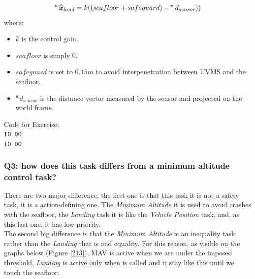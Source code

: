 \documentclass{article}
\begin{document}
\begin{equation}
\large
    ^{w}\dot{\overline{\boldsymbol{x}}}_{land} = k((seafloor + safeguard) - ^w d_{sensor})) %
\end{equation}
where:
\begin{itemize}
    \item $k$ is the control gain.
    \item $seafloor$ is simply 0.
    \item $safeguard$ is set to $0.15m$  to avoid interpenetration between UVMS and the seafloor.
    \item $^w d_{sensor}$ is the distance vector measured by the sensor and projected on the world frame.
\end{itemize} 

\colorbox{mygray}{\parbox{0.9\textwidth}{Code for Exercise: \\
\texttt{TO DO}\\
\texttt{TO DO}
}}

\subsubsection{Q3: how does this task differs from a minimum altitude control task?}
There are two major difference, the first one is that this task it is not a safety task, it is a action-defining one. The \textit{Minimum Altitude} it is used to avoid crashes with the seafloor, the \textit{Landing} task it is like the \textit{Vehicle Position} task, and, as this last one, it has low priority.\\
The second big difference is that the \textit{Minimum Altitude} is an inequality task rather than the \textit{Landing} that is and equality. For this reason, as visible on the graphs below (Figure \ref{213}), MAV is active when we are under the imposed threshold, \textit{Landing} is active only when is called and it stay like this until we touch the seafloor.
\end{document}
